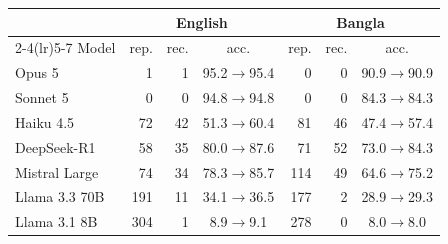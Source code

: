 \begin{tabular}{l rrc rrc}
\toprule
& \multicolumn{3}{c}{English} & \multicolumn{3}{c}{Bangla} \\
\cmidrule(lr){2-4}\cmidrule(lr){5-7}
Model & rep. & rec. & acc. & rep. & rec. & acc. \\
\midrule
Opus 5 & 1 & 1 & 95.2$\rightarrow$95.4 & 0 & 0 & 90.9$\rightarrow$90.9 \\
Sonnet 5 & 0 & 0 & 94.8$\rightarrow$94.8 & 0 & 0 & 84.3$\rightarrow$84.3 \\
Haiku 4.5 & 72 & 42 & 51.3$\rightarrow$60.4 & 81 & 46 & 47.4$\rightarrow$57.4 \\
DeepSeek-R1 & 58 & 35 & 80.0$\rightarrow$87.6 & 71 & 52 & 73.0$\rightarrow$84.3 \\
Mistral Large & 74 & 34 & 78.3$\rightarrow$85.7 & 114 & 49 & 64.6$\rightarrow$75.2 \\
Llama 3.3 70B & 191 & 11 & 34.1$\rightarrow$36.5 & 177 & 2 & 28.9$\rightarrow$29.3 \\
Llama 3.1 8B & 304 & 1 & 8.9$\rightarrow$9.1 & 278 & 0 & 8.0$\rightarrow$8.0 \\
\bottomrule
\end{tabular}
